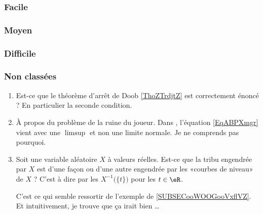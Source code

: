\subsubsection{Facile}

\subsubsection{Moyen}

\subsubsection{Difficile}

\subsubsection{Non classées}

\begin{enumerate}

    \item
        Est-ce que le théorème d'arrêt de Doob \ref{ThoZTrdjtZ} est correctement énoncé ? En particulier la seconde condition. 
    \item
        À propos du problème de la ruine du joueur. Dans \cite{KXjFWKA}, l'équation \eqref{EqABPXmgr} vient avec une \( \limsup\) et non une limite normale. Je ne comprends pas pourquoi.

    \item
        Soit une variable aléatoire \( X\) à valeurs réelles. Est-ce que la tribu engendrée par \( X\) est d'une façon ou d'une autre engendrée par les «courbes de niveau» de \( X\) ? C'est à dire par les \( X^{-1}\big( \{ t \} \big)\) pour les \( t\in \eR\). 

        C'est ce qui semble ressortir de l'exemple de \ref{SUBSECooWOOGooVxflVZ}. Et intuitivement, je trouve que ça irait bien \ldots
\end{enumerate}

